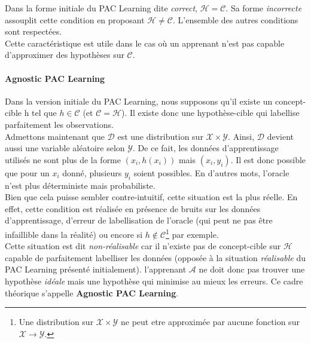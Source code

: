 \noindent Dans la forme initiale du PAC Learning dite \textit{correct}, $\mathcal{H}=\mathcal{C}$. Sa forme \textit{incorrecte} assouplit cette condition en proposant $\mathcal{H} \neq \mathcal{C}$. L'ensemble des autres conditions sont respectées.\\

\noindent Cette caractéristique est utile dans le cas où un apprenant n'est pas capable d'approximer des hypothèses sur $\mathcal{C}$.

\paragraph{Agnostic PAC Learning}

\noindent Dans la version initiale du PAC Learning, nous supposons qu'il existe un concept-cible h tel que $h \in \mathcal{C}$ (et $\mathcal{C}=\mathcal{H}$). Il existe donc une hypothèse-cible qui labellise parfaitement les observations. \\

\noindent Admettons maintenant que $\mathcal{D}$ est une distribution sur $\mathcal{X} \times \mathcal{Y}$. Ainsi, $\mathcal{D}$ devient aussi une variable aléatoire selon $\mathcal{Y}$. De ce fait, les données d'apprentissage utilisés ne sont plus de la forme $(x_i,h(x_i))$ mais $(x_i,y_i)$. Il est donc possible que pour un $x_i$ donné, plusieurs $y_i$ soient possibles. En d'autres mots, l'oracle n'est plus déterministe mais probabiliste.\\

\noindent Bien que cela puisse sembler contre-intuitif, cette situation est la plus réelle. En effet, cette condition est réalisée en présence de bruits sur les données d'apprentissage, d'erreur de labellisation de l'oracle (qui peut ne pas être infaillible dans la réalité) ou encore si $h \not\in \mathcal{C}$\footnote{Une distribution sur $\mathcal{X}\times\mathcal{Y}$ ne peut etre approximée par aucune fonction sur $\mathcal{X}\rightarrow\mathcal{Y}$.} par exemple.\\

\noindent Cette situation est dit \textit{non-réalisable} car il n'existe pas de concept-cible sur $\mathcal{H}$ capable de parfaitement labelliser les données (opposée à la situation \textit{réalisable} du PAC Learning présenté initialement). l'apprenant $\mathcal{A}$ ne doit donc pas trouver une hypothèse \textit{idéale} mais une hypothèse qui minimise au mieux les erreurs. Ce cadre théorique s'appelle \textbf{Agnostic PAC Learning}\cite{agn_pac}.\\

